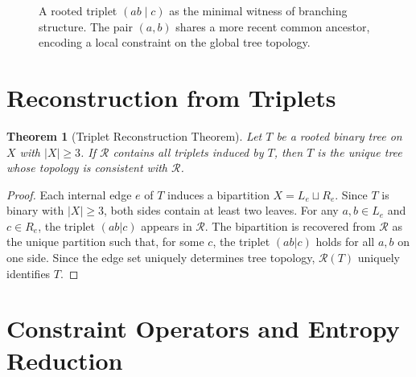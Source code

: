 \documentclass[12pt,a4paper,oneside]{book}
\numberwithin{equation}{chapter}
\theoremstyle{plain}
\newtheorem{theorem}{Theorem}[chapter]
\theoremstyle{definition}
\theoremstyle{remark}
\begin{document}
\begin{figure}[htbp]
\centering
{}
\caption{A rooted triplet $(ab\mid c)$ as the minimal witness of
branching structure. The pair $(a,b)$ shares a more recent common
ancestor, encoding a local constraint on the global tree topology.}
\label{fig:triplet-witness}
\end{figure}

\section{Reconstruction from Triplets}

\begin{theorem}[Triplet Reconstruction Theorem]
\label{thm:triplet-reconstruction}
Let $T$ be a rooted binary tree on $X$ with $|X| \geq 3$. If
$\mathcal{R}$ contains all triplets induced by $T$, then $T$ is the
unique tree whose topology is consistent with $\mathcal{R}$.
\end{theorem}

\begin{proof}
Each internal edge $e$ of $T$ induces a bipartition $X = L_e \sqcup
R_e$. Since $T$ is binary with $|X| \geq 3$, both sides contain at
least two leaves. For any $a,b \in L_e$ and $c \in R_e$, the triplet
$(ab|c)$ appears in $\mathcal{R}$. The bipartition is recovered from
$\mathcal{R}$ as the unique partition such that, for some $c$, the
triplet $(ab|c)$ holds for all $a,b$ on one side. Since the edge set
uniquely determines tree topology, $\mathcal{R}(T)$ uniquely
identifies $T$.
\end{proof}

\section{Constraint Operators and Entropy Reduction}
\end{document}
